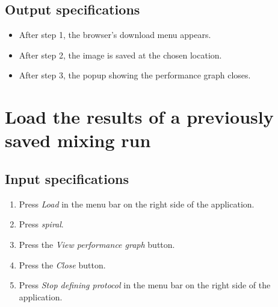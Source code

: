 \subsection*{Output specifications}
\begin{itemize}
\item After step 1, the browser's download menu appears.
\item After step 2, the image is saved at the chosen location.
\item After step 3, the popup showing the performance graph closes.
\end{itemize}
 
\section{Load the results of a previously saved mixing run}

\subsection*{Input specifications}
\begin{enumerate}
\item Press \emph{Load} in the menu bar on the right side of the application.
\item Press \emph{spiral}.
\item Press the \emph{View performance graph} button.
\item Press the \emph{Close} button.
\item Press \emph{Stop defining protocol} in the menu bar on the right side of the application.
\end{enumerate}


